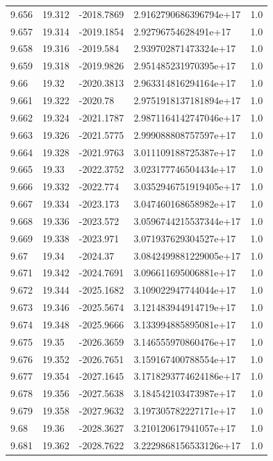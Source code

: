 \begin{tabular}{lllll}
9.656 & 19.312 & -2018.7869 & 2.9162790686396794e+17 & 1.0 \\
9.657 & 19.314 & -2019.1854 & 2.92796754628491e+17 & 1.0 \\
9.658 & 19.316 & -2019.584 & 2.939702871473324e+17 & 1.0 \\
9.659 & 19.318 & -2019.9826 & 2.951485231970395e+17 & 1.0 \\
9.66 & 19.32 & -2020.3813 & 2.963314816294164e+17 & 1.0 \\
9.661 & 19.322 & -2020.78 & 2.9751918137181894e+17 & 1.0 \\
9.662 & 19.324 & -2021.1787 & 2.9871164142747046e+17 & 1.0 \\
9.663 & 19.326 & -2021.5775 & 2.999088808757597e+17 & 1.0 \\
9.664 & 19.328 & -2021.9763 & 3.011109188725387e+17 & 1.0 \\
9.665 & 19.33 & -2022.3752 & 3.023177746504434e+17 & 1.0 \\
9.666 & 19.332 & -2022.774 & 3.0352946751919405e+17 & 1.0 \\
9.667 & 19.334 & -2023.173 & 3.047460168658982e+17 & 1.0 \\
9.668 & 19.336 & -2023.572 & 3.0596744215537344e+17 & 1.0 \\
9.669 & 19.338 & -2023.971 & 3.071937629304527e+17 & 1.0 \\
9.67 & 19.34 & -2024.37 & 3.0842499881229005e+17 & 1.0 \\
9.671 & 19.342 & -2024.7691 & 3.096611695006881e+17 & 1.0 \\
9.672 & 19.344 & -2025.1682 & 3.109022947744044e+17 & 1.0 \\
9.673 & 19.346 & -2025.5674 & 3.121483944914719e+17 & 1.0 \\
9.674 & 19.348 & -2025.9666 & 3.133994885895081e+17 & 1.0 \\
9.675 & 19.35 & -2026.3659 & 3.146555970860476e+17 & 1.0 \\
9.676 & 19.352 & -2026.7651 & 3.159167400788554e+17 & 1.0 \\
9.677 & 19.354 & -2027.1645 & 3.1718293774624186e+17 & 1.0 \\
9.678 & 19.356 & -2027.5638 & 3.184542103473987e+17 & 1.0 \\
9.679 & 19.358 & -2027.9632 & 3.197305782227171e+17 & 1.0 \\
9.68 & 19.36 & -2028.3627 & 3.210120617941057e+17 & 1.0 \\
9.681 & 19.362 & -2028.7622 & 3.2229868156533126e+17 & 1.0 \\

\end{tabular}
